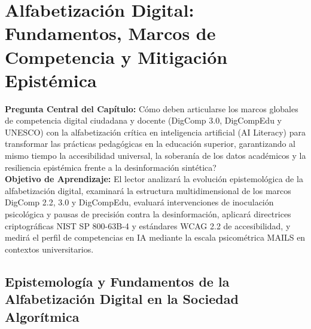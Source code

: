 \section[Alfabetización Digital]{Alfabetización Digital: Fundamentos, Marcos de Competencia y Mitigación Epistémica}

\begin{cajabeige}
\textbf{Pregunta Central del Capítulo:} \textquestiondown Cómo deben articularse los marcos globales de competencia digital ciudadana y docente (DigComp 3.0, DigCompEdu y UNESCO) con la alfabetización crítica en inteligencia artificial (AI Literacy) para transformar las prácticas pedagógicas en la educación superior, garantizando al mismo tiempo la accesibilidad universal, la soberanía de los datos académicos y la resiliencia epistémica frente a la desinformación sintética?\\[0.3cm]
\textbf{Objetivo de Aprendizaje:} El lector analizará la evolución epistemológica de la alfabetización digital, examinará la estructura multidimensional de los marcos DigComp 2.2, 3.0 y DigCompEdu, evaluará intervenciones de inoculación psicológica y pausas de precisión contra la desinformación, aplicará directrices criptográficas NIST SP 800-63B-4 y estándares WCAG 2.2 de accesibilidad, y medirá el perfil de competencias en IA mediante la escala psicométrica MAILS en contextos universitarios.
\end{cajabeige}


\vspace{0.4cm}

\subsection{Epistemología y Fundamentos de la Alfabetización Digital en la Sociedad Algorítmica}

